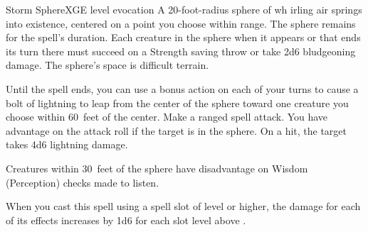 \begin{spell}{Storm Sphere}{XGE}{ level evocation}
{
}
A 20-foot-radius sphere of wh irling air springs into existence,
centered on a point you choose within range. The sphere remains
for the spell's duration. Each creature in the sphere when
it appears or that ends its turn there must succeed on a
Strength saving throw or take 2d6 bludgeoning damage.
The sphere's space is difficult terrain.

Until the spell ends, you can use a bonus action on
each of your turns to cause a bolt of lightning to leap
from the center of the sphere toward one creature you
choose within 60~feet of the center. Make a ranged spell
attack. You have advantage on the attack roll if the target
is in the sphere. On a hit, the target takes 4d6 lightning
damage.

Creatures within 30~feet of the sphere have
disadvantage on Wisdom (Perception) checks made to listen.

 When you cast this spell using a
spell slot of  level or higher, the damage for each of
its effects increases by 1d6 for each slot level above .
\end{spell}